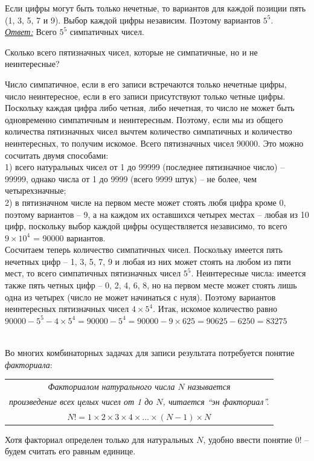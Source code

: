 \begin{prf}
	Если цифры могут быть только нечетные, то вариантов для каждой позиции пять (1, 3, 5, 7 и 9). Выбор каждой цифры независим. Поэтому вариантов $5^5$.\\ \textit{\underline{Ответ:}} Всего $5^5$ симпатичных чисел.
\end{prf}

\begin{thm}
	Сколько всего пятизначных чисел, которые не симпатичные, но и не неинтересные?
\end{thm}

\begin{prf}
	Число симпатичное, если в его записи встречаются только нечетные цифры, число неинтересное, если в его записи присутствуют только четные цифры. Поскольку каждая цифра либо четная, либо нечетная, то число не может быть одновременно симпатичным и неинтересным. Поэтому, если мы из общего количества пятизначных чисел вычтем количество симпатичных и количество неинтересных, то получим искомое.
	Всего пятизначных чисел 90000. Это можно сосчитать двумя способами:\\ 1) всего натуральных чисел от 1 до 99999 (последнее пятизначное число) -- 99999, однако числа от 1 до 9999 (всего 9999 штук) -- не более, чем четырехзначные;\\ 2) в пятизначном числе на первом месте может стоять любя цифра кроме 0, поэтому вариантов -- 9, а на каждом их оставшихся четырех местах -- любая из 10 цифр, поскольку выбор каждой цифры осуществляется независимо, то всего $9\times10^4$ = 90000 вариантов.\\
	Сосчитаем теперь количество симпатичных чисел. Поскольку имеется пять нечетных цифр – 1, 3, 5, 7, 9 и любая из них может стоять на любом из пяти мест, то всего симпатичных пятизначных чисел $5^5$.
	Неинтересные числа: имеется также пять четных цифр – 0, 2, 4, 6, 8, но на первом месте может стоять лишь одна из четырех (число не может начинаться с нуля). Поэтому вариантов неинтересных пятизначных чисел $4\times 5^4$.
	Итак, искомое количество равно $ 90000 - 5^5 - 4\times 5^4 = 90000 - 5^4 = 90000 - 9\times625 = 90625 - 6250 = 83275 $
\end{prf}\\

Во многих комбинаторных задачах для записи результата потребуется понятие \textit{факториала}:

\begin{table}[h]
	\centering
	\begin{tabular}{|c|}
		\hline
		\textit{Факториалом натурального числа $N$ называется}\\ \textit{произведение всех целых чисел от 1 до $N$, читается “эн факториал”.}\\
		\textit{$N!=1\times 2\times 3\times 4 \times\dots \times (N-1)\times N$}\\
		\hline
	\end{tabular}
\end{table}
Хотя факториал определен только для натуральных $N$, удобно ввести понятие $0!$ – будем считать его равным единице.

